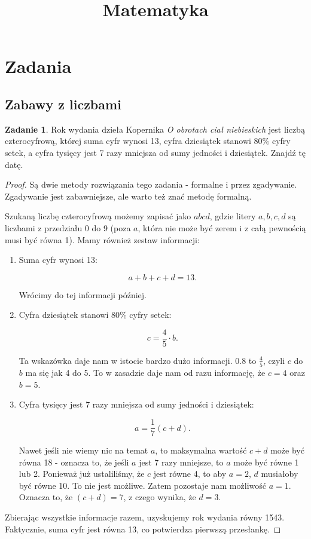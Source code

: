 \documentclass[11pt]{article}
\title{Matematyka}
\theoremstyle{definition}
\newtheorem{zad}{Zadanie}
\begin{document}
\maketitle
\tableofcontents


\section{Zadania}
\subsection{Zabawy z liczbami}

\begin{zad}
Rok wydania dzieła Kopernika \textit{O obrotach ciał niebieskich} jest liczbą czterocyfrową, której suma cyfr wynosi 13, cyfra dziesiątek stanowi $80\%$ cyfry setek, a cyfra tysięcy jest 7 razy mniejsza od sumy jedności i dziesiątek. Znajdź tę datę.
\end{zad}

\begin{proof}
Są dwie metody rozwiązania tego zadania - formalne i przez zgadywanie. Zgadywanie jest zabawniejsze, ale warto też znać metodę formalną.

Szukaną liczbę czterocyfrową możemy zapisać jako $abcd$, gdzie litery $a,b,c,d$ są liczbami z przedziału 0 do 9 (poza $a$, która nie może być zerem i z całą pewnością musi być równa 1). Mamy również zestaw informacji:

\begin{enumerate}
\item Suma cyfr wynosi 13:

$$a+b+c+d = 13.$$

Wrócimy do tej informacji później.
\item Cyfra dziesiątek stanowi $80\%$ cyfry setek:

$$c = \frac45 \cdot b.$$

Ta wskazówka daje nam w istocie bardzo dużo informacji. $0.8$ to $\frac 45$, czyli $c$ do $b$ ma się jak 4 do 5. To w zasadzie daje nam od razu informację, że $c = 4$ oraz $b = 5$.

\item Cyfra tysięcy jest 7 razy mniejsza od sumy jedności i dziesiątek:

$$a = \frac17 (c+d).$$

Nawet jeśli nie wiemy nic na temat $a$, to maksymalna wartość $c+d$ może być równa 18 - oznacza to, że jeśli $a$ jest 7 razy mniejsze, to $a$ może być równe 1 lub 2. Ponieważ już ustaliliśmy, że $c$ jest równe 4, to aby $a=2$, $d$ musiałoby być równe 10. To nie jest możliwe. Zatem pozostaje nam możliwość $a = 1$. Oznacza to, że $(c+d) = 7$, z czego wynika, że $d = 3$.
\end{enumerate}
Zbierając wszystkie informacje razem, uzyskujemy rok wydania równy 1543. Faktycznie, suma cyfr jest równa 13, co potwierdza pierwszą przesłankę.
\end{proof}
\end{document}
